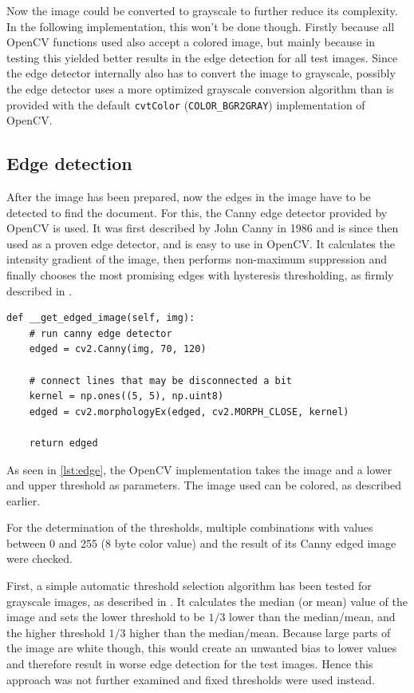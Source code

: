 Now the image could be converted to grayscale to further reduce its complexity. In the following implementation, this won't be done though. Firstly because all OpenCV functions used also accept a colored image, but mainly because in testing this yielded better results in the edge detection for all test images. Since the edge detector internally also has to convert the image to grayscale, possibly the edge detector uses a more optimized grayscale conversion algorithm than is provided with the default \texttt{cvtColor} (\texttt{COLOR\_BGR2GRAY}) implementation of OpenCV.

\subsection{Edge detection}

After the image has been prepared, now the edges in the image have to be detected to find the document. For this, the Canny edge detector provided by OpenCV is used. It was first described by John Canny in 1986 \cite{canny_paper} and is since then used as a proven edge detector, and is easy to use in OpenCV. It calculates the intensity gradient of the image, then performs non-maximum suppression and finally chooses the most promising edges with hysteresis thresholding, as firmly described in \cite{cv_canny}.

\begin{lstlisting}[caption={Edge detection method}, label={lst:edge}]
def __get_edged_image(self, img):
    # run canny edge detector
    edged = cv2.Canny(img, 70, 120)

    # connect lines that may be disconnected a bit
    kernel = np.ones((5, 5), np.uint8)
    edged = cv2.morphologyEx(edged, cv2.MORPH_CLOSE, kernel)

    return edged
\end{lstlisting}

As seen in \autoref{lst:edge}, the OpenCV implementation takes the image and a lower and upper threshold as parameters. The image used can be colored, as described earlier.

For the determination of the thresholds, multiple combinations with values between 0 and 255 (8 byte color value) and the result of its Canny edged image were checked.

First, a simple automatic threshold selection algorithm has been tested for grayscale images, as described in \cite{autocanny}. It calculates the median (or mean) value of the image and sets the lower threshold to be $1/3$ lower than the median/mean, and the higher threshold $1/3$ higher than the median/mean. Because large parts of the image are white though, this would create an unwanted bias to lower values and therefore result in worse edge detection for the test images. Hence this approach was not further examined and fixed thresholds were used instead.


